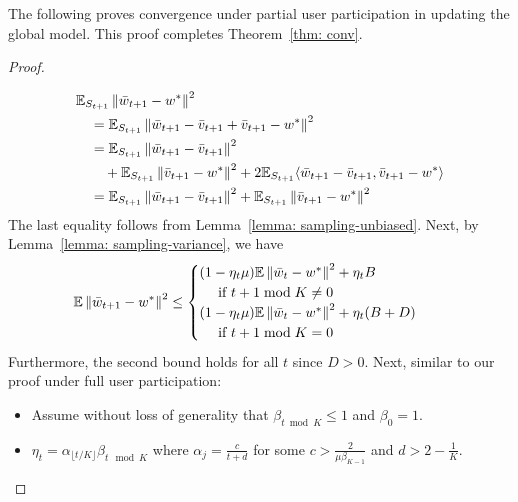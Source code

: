 The following proves convergence under partial user participation in updating the global model.
This proof completes Theorem~\ref{thm: conv}.
\begin{proof}
    \label{pf: partial}
    
    \begin{align*}
    \allowdisplaybreaks
        & \mathbb{E}_{S_{t + 1}} \norm{\Bar{w}_{t + 1} - w^*}^2 \\
        & \quad = \mathbb{E}_{S_{t + 1}} \norm{\Bar{w}_{t + 1} - \Bar{v}_{t + 1} + \Bar{v}_{t + 1} - w^*}^2 \\
        & \quad = \mathbb{E}_{S_{t + 1}} \norm{\Bar{w}_{t + 1} - \Bar{v}_{t + 1}}^2 \\
        & \qquad + \mathbb{E}_{S_{t + 1}} \norm{\Bar{v}_{t + 1} - w^*}^2 %
        + 2 \mathbb{E}_{S_{t + 1}} \langle \Bar{w}_{t + 1} - \Bar{v}_{t + 1}, \Bar{v}_{t + 1} - w^* \rangle \\
        & \quad = \mathbb{E}_{S_{t + 1}} \norm{\Bar{w}_{t + 1} - \Bar{v}_{t + 1}}^2 + \mathbb{E}_{S_{t + 1}} \norm{\Bar{v}_{t + 1} - w^*}^2 \\
    \end{align*}
    The last equality follows from Lemma~\ref{lemma: sampling-unbiased}. Next, by Lemma~\ref{lemma: sampling-variance}, we have
    \begin{align*}
    \allowdisplaybreaks
        & \mathbb{E} \norm{\Bar{w}_{t + 1} - w^*}^2 %
        \leq \begin{cases}
            (1 - \eta_t \mu) \mathbb{E} \norm{\Bar{w}_{t} - w^*}^2 + \eta_t B \\
            \quad \textrm{ if } t + 1 \bmod K \neq 0 \\
            (1 - \eta_t \mu) \mathbb{E} \norm{\Bar{w}_{t} - w^*}^2 + \eta_t (B + D) \\
            \quad \textrm{ if } t + 1 \bmod K = 0 \\
        \end{cases}
    \end{align*}
    Furthermore, the second bound holds for all $t$ since $D > 0$. Next, similar to our proof under full user participation:
    \begin{itemize}
        \item Assume without loss of generality that $\beta_{t \bmod K} \leq 1$ and $\beta_{0} = 1$.
        \item $\eta_t = \alpha_{\lfloor t/K \rfloor} \beta_{t \mod K}$ where $\alpha_j = \frac{c}{t + d}$ for some $c > \frac{2}{\mu \beta_{K - 1}}$ and $d > 2 - \frac{1}{K}$.
    \end{itemize}
    

\end{proof}
